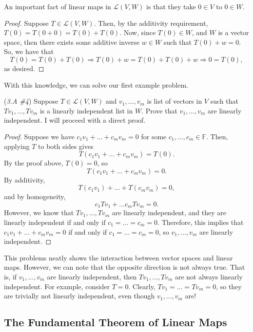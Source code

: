 \documentclass{article}
\renewcommand{\L}{\mathcal{L}}
\newcommand{\F}{\mathbb{F}}
\theoremstyle{definition}
\begin{document}
An important fact of linear maps in $\L(V, W)$ is that they take $0 \in V$ to $0 \in W$. 
\begin{proof}
    Suppose $T \in \L(V, W)$. Then, by the additivity requirement, $T(0) = T(0 + 0) = T(0) + T(0)$. Now, since $T(0) \in W$, and $W$ is a vector space, then there exists some additive inverse $w \in W$ such that $T(0) + w = 0$. So, we have that $$T(0) = T(0) + T(0) \Rightarrow T(0) + w = T(0) + T(0) + w \Rightarrow 0 = T(0),$$ as desired.
\end{proof}

With this knowledge, we can solve our first example problem.
\begin{problem}{(\textit{3.A \#4}) Suppose $T \in \L(V, W)$ and $v_1, \dots, v_m$ is list of vectors in $V$ such that $Tv_1, \dots, Tv_m$ is a linearly independent list in $W$. Prove that $v_1, \dots, v_m$ are linearly independent.}
    I will proceed with a direct proof. 
    \begin{proof}
        Suppose we have $c_1v_1 + \dots + c_mv_m = 0$ for some $c_1, \dots, c_m \in \F$. Then, applying $T$ to both sides gives $$T(c_1v_1 + \dots + c_mv_m) = T(0).$$ By the proof above, $T(0) = 0$, so $$T(c_1v_1 + \dots + c_mv_m) = 0.$$ By additivity, $$T(c_1v_1) + \dots + T(c_mv_m) = 0,$$ and by homogeneity, $$c_1Tv_1 + \dots c_mTv_m = 0.$$ However, we know that $Tv_1, \dots, Tv_m$ are linearly independent, and they are linearly independent if and only if $c_1 = \dots = c_m = 0$. Therefore, this implies that $c_1v_1 + \dots + c_mv_m = 0$ if and only if $c_1 = \dots = c_m = 0$, so $v_1, \dots, v_m$ are linearly independent.
    \end{proof}
\end{problem}

This problems neatly shows the interaction between vector spaces and linear maps. However, we can note that the opposite direction is not always true. That is, if $v_1, \dots, v_m$ are linearly independent, then $Tv_1, \dots, Tv_m$ are not always linearly independent. For example, consider $T = 0$. Clearly, $Tv_1 = \dots = Tv_m = 0$, so they are trivially not linearly independent, even though $v_1, \dots, v_m$ are!

\subsection{The Fundamental Theorem of Linear Maps}
\end{document}
